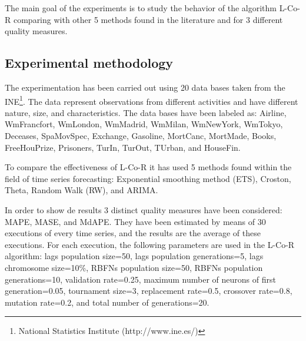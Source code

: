 \documentclass[a4paper,twoside]{article}
\newcommand{\metodo}{L-Co-R}
\begin{document}
\noindent The main goal of the experiments is to study the behavior of the algorithm {\metodo} comparing with other 5 methods found in the literature and for 3 different quality measures. %


\subsection{Experimental methodology}
\label{experimentalmethodoly}

\noindent The experimentation has been carried out using 20 data bases taken from the INE\footnote{National Statistics Institute (http://www.ine.es/)}. The data represent observations from different activities and have different nature, size, and characteristics. The data bases have been labeled as: Airline, WmFrancfort, WmLondon, WmMadrid, WmMilan, WmNewYork, WmTokyo, Deceases, SpaMovSpec, Exchange, Gasoline, MortCanc, MortMade, Books, FreeHouPrize, Prisoners, TurIn, TurOut, TUrban, and HouseFin. %


To compare the effectiveness of {\metodo} it has used 5 methods found within the field of time series forecasting: Exponential smoothing method (ETS), Croston, Theta, Random Walk (RW), and ARIMA. %


In order to show de results 3 distinct quality measures have been considered: MAPE, MASE, and MdAPE. They have been estimated by means of 30 executions of every time series, and the results are the average of these executions. For each execution, the following parameters are used in the {\metodo} algorithm: lags population size=50, lags population generations=5, lags chromosome size=10\%, RBFNs population size=50, RBFNs population generations=10, validation rate=0.25, maximum number of neurons of first generation=0.05, tournament size=3, replacement rate=0.5, crossover rate=0.8, mutation rate=0.2, and total number of generations=20.
\end{document}
